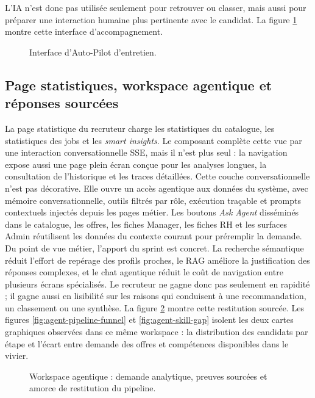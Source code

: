 L'IA n'est donc pas utilisée seulement pour retrouver ou classer, mais aussi pour préparer une interaction humaine plus pertinente avec le candidat. La figure \ref{fig:autopilot-guide} montre cette interface d'accompagnement.

\begin{figure}[H]
  \centering
  \caption{\label{fig:autopilot-guide}Interface d'Auto-Pilot d'entretien.}
\end{figure}

\subsection{Page statistiques, workspace agentique et réponses sourcées}
La page statistique du recruteur charge les statistiques du catalogue, les statistiques des jobs et les \textit{smart insights}. Le composant  complète cette vue par une interaction conversationnelle SSE, mais il n'est plus seul : la navigation expose aussi une page  plein écran conçue pour les analyses longues, la consultation de l'historique et les traces détaillées.
Cette couche conversationnelle n'est pas décorative. Elle ouvre un accès agentique aux données du système, avec mémoire conversationnelle, outils filtrés par rôle, exécution traçable et prompts contextuels injectés depuis les pages métier. Les boutons \textit{Ask Agent} disséminés dans le catalogue, les offres, les fiches Manager, les fiches RH et les surfaces Admin réutilisent les données du contexte courant pour préremplir la demande.
Du point de vue métier, l'apport du sprint est concret. La recherche sémantique réduit l'effort de repérage des profils proches, le RAG améliore la justification des réponses complexes, et le chat agentique réduit le coût de navigation entre plusieurs écrans spécialisés. Le recruteur ne gagne donc pas seulement en rapidité ; il gagne aussi en lisibilité sur les raisons qui conduisent à une recommandation, un classement ou une synthèse. La figure \ref{fig:agent-workspace} montre cette restitution sourcée. Les figures \ref{fig:agent-pipeline-funnel} et \ref{fig:agent-skill-gap} isolent les deux cartes graphiques observées dans ce même workspace : la distribution des candidats par étape et l'écart entre demande des offres et compétences disponibles dans le vivier.
\begin{figure}[H]
  \centering
  \caption{\label{fig:agent-workspace}Workspace agentique : demande analytique, preuves sourcées et amorce de restitution du pipeline.}
\end{figure}

